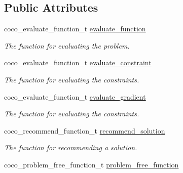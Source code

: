 \subsection*{Public Attributes}
\begin{DoxyCompactItemize}
\item 
coco\+\_\+evaluate\+\_\+function\+\_\+t \hyperlink{structcoco__problem__s_ac34034df9c3632ace97338666e38519f}{evaluate\+\_\+function}\hypertarget{structcoco__problem__s_ac34034df9c3632ace97338666e38519f}{}\label{structcoco__problem__s_ac34034df9c3632ace97338666e38519f}

\begin{DoxyCompactList}\small\item\em The function for evaluating the problem. \end{DoxyCompactList}\item 
coco\+\_\+evaluate\+\_\+function\+\_\+t \hyperlink{structcoco__problem__s_a6ee6671da42f3233b7a6e94cdc78c3ea}{evaluate\+\_\+constraint}\hypertarget{structcoco__problem__s_a6ee6671da42f3233b7a6e94cdc78c3ea}{}\label{structcoco__problem__s_a6ee6671da42f3233b7a6e94cdc78c3ea}

\begin{DoxyCompactList}\small\item\em The function for evaluating the constraints. \end{DoxyCompactList}\item 
coco\+\_\+evaluate\+\_\+function\+\_\+t \hyperlink{structcoco__problem__s_a193e32e7d05a9955a11cd83ed7f1b15c}{evaluate\+\_\+gradient}\hypertarget{structcoco__problem__s_a193e32e7d05a9955a11cd83ed7f1b15c}{}\label{structcoco__problem__s_a193e32e7d05a9955a11cd83ed7f1b15c}

\begin{DoxyCompactList}\small\item\em The function for evaluating the constraints. \end{DoxyCompactList}\item 
coco\+\_\+recommend\+\_\+function\+\_\+t \hyperlink{structcoco__problem__s_a8d05f236afe407722ff3d38fe190498a}{recommend\+\_\+solution}\hypertarget{structcoco__problem__s_a8d05f236afe407722ff3d38fe190498a}{}\label{structcoco__problem__s_a8d05f236afe407722ff3d38fe190498a}

\begin{DoxyCompactList}\small\item\em The function for recommending a solution. \end{DoxyCompactList}\item 
coco\+\_\+problem\+\_\+free\+\_\+function\+\_\+t \hyperlink{structcoco__problem__s_aef553afc0d07ae780ade0d12d061ff33}{problem\+\_\+free\+\_\+function}\hypertarget{structcoco__problem__s_aef553afc0d07ae780ade0d12d061ff33}{}\label{structcoco__problem__s_aef553afc0d07ae780ade0d12d061ff33}


\end{DoxyCompactItemize}
